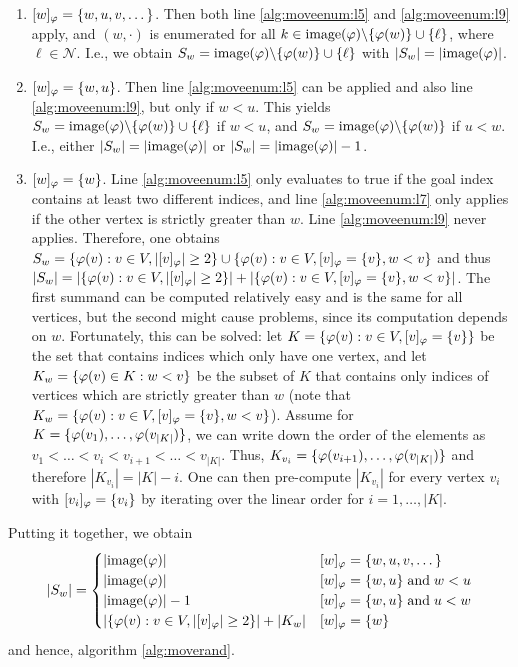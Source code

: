 \begin{enumerate}
    \item $[w]_\varphi = \{ w,u,v,\dots \}$. Then both line \ref{alg:moveenum:l5} and \ref{alg:moveenum:l9} apply, and $(w,\cdot)$ is enumerated for all $k \in \mathrm{image}(\varphi)\backslash\{\varphi(w)\} \cup \{ \ell \}$, where $\ell \in \mathcal{N}$. I.e., we obtain $S_w = \mathrm{image}(\varphi)\backslash\{\varphi(w)\} \cup \{ \ell \}$ with $|S_w| =|\mathrm{image}(\varphi)|$.
    \item $[w]_\varphi = \{ w,u \}$. Then line \ref{alg:moveenum:l5} can be applied and also line \ref{alg:moveenum:l9}, but only if $w < u$. This yields $S_w = \mathrm{image}(\varphi)\backslash \{ \varphi(w)\} \cup \{ \ell \}$ if $w < u$, and $S_w = \mathrm{image}(\varphi)\backslash \{ \varphi(w) \}$ if $u<w$. I.e., either $|S_w| =|\mathrm{image}(\varphi)|$ or $|S_w| =|\mathrm{image}(\varphi)|-1$.
    \item $[w]_\varphi = \{ w \}$. Line \ref{alg:moveenum:l5} only evaluates to true if the goal index contains at least two different indices, and line \ref{alg:moveenum:l7} only applies if the other vertex is strictly greater than $w$. Line \ref{alg:moveenum:l9} never applies. Therefore, one obtains $S_w = \{ \varphi(v) : v\in V, |[v]_\varphi| \geq 2 \} \cup \{ \varphi(v) : v\in V, [v]_\varphi = \{ v \}, w < v \}$ and thus $|S_w| = |\{ \varphi(v) : v\in V, |[v]_\varphi| \geq 2 \}|+|\{ \varphi(v) : v\in V, [v]_\varphi = \{ v \}, w < v \}|$. The first summand can be computed relatively easy and is the same for all vertices, but the second might cause problems, since its computation depends on $w$. Fortunately, this can be solved: let $K = \{ \varphi(v) : v\in V, [v]_\varphi = \{ v \}\}$ be the set that contains indices which only have one vertex, and let $K_w = \{ \varphi(v) \in K : w < v \}$ be the subset of $K$ that contains only indices of vertices which are strictly greater than $w$ (note that $K_w = \{ \varphi(v) : v\in V, [v]_\varphi = \{ v \}, w < v \}$). Assume for $K = \{ \varphi(v_1),\dots,\varphi(v_{|K|}) \}$, we can write down the order of the elements as $ v_1 < \dots < v_i < v_{i+1} < \dots < v_{|K|} $. Thus, $K_{v_i} = \{ \varphi(v_{i+1}),\dots,\varphi(v_{|K|})\}$ and therefore $|K_{v_i}| = |K| - i$. One can then pre-compute $|K_{v_i}|$ for every vertex $v_i$ with $[v_i]_\varphi = \{v_i\}$ by iterating over the linear order for $i=1,\dots,|K|$.
\end{enumerate}
Putting it together, we obtain 
\begin{align}
    |S_w| = \begin{cases}
        |\mathrm{image}(\varphi)| & [w]_\varphi = \{ w,u,v,\dots \} \\
        |\mathrm{image}(\varphi)| & [w]_\varphi = \{w,u\} \;\text{and}\; w < u \\ 
        |\mathrm{image}(\varphi)|-1 & [w]_\varphi = \{w,u\} \;\text{and}\; u < w \\
        |\{ \varphi(v) : v\in V, |[v]_\varphi| \geq 2 \}| +|K_w| & [w]_\varphi = \{w\}
    \end{cases} \label{eq:S_w}
\end{align}
and hence, algorithm \ref{alg:moverand}.

